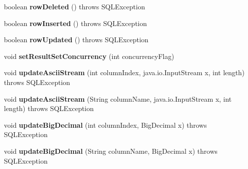 \begin{DoxyCompactItemize}
boolean {\bfseries row\+Deleted} ()  throws S\+Q\+L\+Exception 
\item 
\mbox{\label{classcom_1_1mysql_1_1cj_1_1jdbc_1_1result_1_1_updatable_result_set_acb0af01c76787058c6c6d9606d200dc1}} 
boolean {\bfseries row\+Inserted} ()  throws S\+Q\+L\+Exception 
\item 
\mbox{\label{classcom_1_1mysql_1_1cj_1_1jdbc_1_1result_1_1_updatable_result_set_a043afc3c3a1071615bb1af7386a3d5bf}} 
boolean {\bfseries row\+Updated} ()  throws S\+Q\+L\+Exception 
\item 
\mbox{\label{classcom_1_1mysql_1_1cj_1_1jdbc_1_1result_1_1_updatable_result_set_a6aa359dffbca97bd2ca0c71429ab1119}} 
void {\bfseries set\+Result\+Set\+Concurrency} (int concurrency\+Flag)
\item 
\mbox{\label{classcom_1_1mysql_1_1cj_1_1jdbc_1_1result_1_1_updatable_result_set_abb0e30423b400fc6e907b5388ae3b4dd}} 
void {\bfseries update\+Ascii\+Stream} (int column\+Index, java.\+io.\+Input\+Stream x, int length)  throws S\+Q\+L\+Exception 
\item 
\mbox{\label{classcom_1_1mysql_1_1cj_1_1jdbc_1_1result_1_1_updatable_result_set_ad1d5c51538ff6b32e8468c1ce8622834}} 
void {\bfseries update\+Ascii\+Stream} (String column\+Name, java.\+io.\+Input\+Stream x, int length)  throws S\+Q\+L\+Exception 
\item 
\mbox{\label{classcom_1_1mysql_1_1cj_1_1jdbc_1_1result_1_1_updatable_result_set_a28b5d74d78a69056aba8ebf47df1fc93}} 
void {\bfseries update\+Big\+Decimal} (int column\+Index, Big\+Decimal x)  throws S\+Q\+L\+Exception 
\item 
\mbox{\label{classcom_1_1mysql_1_1cj_1_1jdbc_1_1result_1_1_updatable_result_set_a3ff33f1d3d288c388a2fdfae180952bc}} 
void {\bfseries update\+Big\+Decimal} (String column\+Name, Big\+Decimal x)  throws S\+Q\+L\+Exception 

\end{DoxyCompactItemize}

